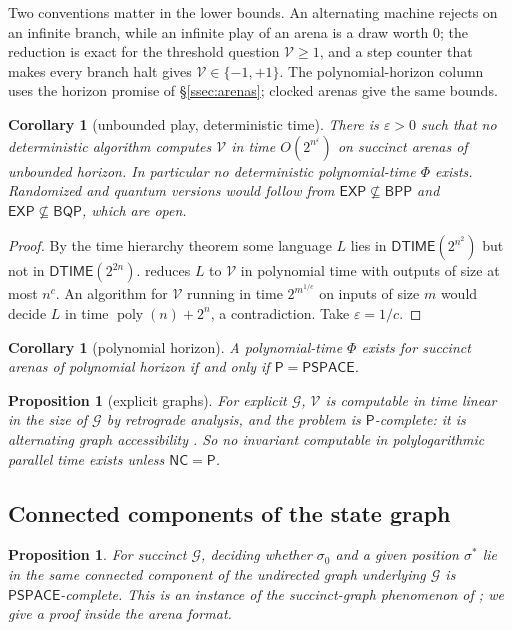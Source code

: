 \documentclass[11pt]{amsart}
\theoremstyle{plain}
\newtheorem{proposition}[theorem]{Proposition}
\newtheorem{corollary}[theorem]{Corollary}
\theoremstyle{definition}
\theoremstyle{remark}
\numberwithin{equation}{section}
\newcommand{\val}{\mathcal{V}}            %
\newcommand{\SG}{\mathcal{G}}             %
\newcommand{\poly}{\operatorname{poly}}
\newcommand{\cls}[1]{\mathsf{#1}}
\newcommand{\PSPACE}{\cls{PSPACE}}
\newcommand{\EXP}{\cls{EXP}}
\newcommand{\BPP}{\cls{BPP}}
\newcommand{\BQP}{\cls{BQP}}
\newcommand{\Pclass}{\cls{P}}
\newcommand{\NC}{\cls{NC}}
\begin{document}
Two conventions matter in the lower bounds. An alternating machine rejects on an infinite branch, while an infinite play of an arena is a draw worth $0$; the reduction is exact for the threshold question $\val\ge1$, and a step counter that makes every branch halt gives $\val\in\{-1,+1\}$. The polynomial-horizon column uses the horizon promise of \S\ref{ssec:arenas}; clocked arenas give the same bounds.

\begin{corollary}[unbounded play, deterministic time]\label{cor:exp}
There is $\varepsilon>0$ such that no deterministic algorithm computes $\val$ in time $O(2^{n^{\varepsilon}})$ on succinct arenas of unbounded horizon. In particular no deterministic polynomial-time $\Phi$ exists. Randomized and quantum versions would follow from $\EXP\not\subseteq\BPP$ and $\EXP\not\subseteq\BQP$, which are open.
\end{corollary}

\begin{proof}
By the time hierarchy theorem \cite{HartmanisStearns} some language $L$ lies in $\mathsf{DTIME}(2^{n^2})$ but not in $\mathsf{DTIME}(2^{2n})$.  reduces $L$ to $\val$ in polynomial time with outputs of size at most $n^c$. An algorithm for $\val$ running in time $2^{m^{1/c}}$ on inputs of size $m$ would decide $L$ in time $\poly(n)+2^{n}$, a contradiction. Take $\varepsilon=1/c$.
\end{proof}

\begin{corollary}[polynomial horizon]\label{cor:polyhorizon}
A polynomial-time $\Phi$ exists for succinct arenas of polynomial horizon if and only if $\Pclass=\PSPACE$.
\end{corollary}

\begin{proposition}[explicit graphs]\label{prop:explicit}
For explicit $\SG$, $\val$ is computable in time linear in the size of $\SG$ by retrograde analysis, and the problem is $\Pclass$-complete: it is alternating graph accessibility \cite{Immerman,GHR}. So no invariant computable in polylogarithmic parallel time exists unless $\NC=\Pclass$.
\end{proposition}

\subsection{Connected components of the state graph}

\begin{proposition}\label{prop:components}
For succinct $\SG$, deciding whether $\sigma_0$ and a given position $\sigma^{*}$ lie in the same connected component of the undirected graph underlying $\SG$ is $\PSPACE$-complete. This is an instance of the succinct-graph phenomenon of \cite{GalperinWigderson,PapadimitriouYannakakis,LozanoBalcazar}; we give a proof inside the arena format.
\end{proposition}
\end{document}
